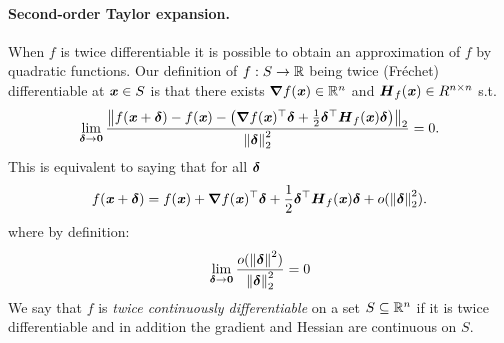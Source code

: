 


\paragraph{Second-order Taylor expansion.}  When $f$ is twice differentiable it is possible to obtain an approximation of $f$ by quadratic functions.
Our definition of $f:S\rightarrow \R$ being twice (Fr\'{e}chet) differentiable at
$\xx \in S$ is that there exists $\grad f(\xx) \in \R^n$ and
$\HH_f(\xx) \in R^{n \times n}$ s.t.
\begin{displaymath}
  \lim_{\ddelta \to \veczero}
  \frac{\norm{f(\xx+\ddelta) -f(\xx)
      -\left( \grad f(\xx)^{\trp} \ddelta + \frac{1}{2}\ddelta^\trp
        \HH_f(\xx) \ddelta \right) }_2}{
    \norm{\ddelta}_2^2
  } = 0
    .
\end{displaymath}
This is equivalent to saying that for all $\ddelta$
\begin{displaymath}
  f(\xx+\ddelta) = f(\xx) + \grad f(\xx)^\trp \ddelta + \frac{1}{2}\ddelta^\trp  \HH_f(\xx) \ddelta + o(\norm{\ddelta}_2^2).
\end{displaymath}
where by definition:
\begin{displaymath}
  \lim_{\ddelta \rightarrow \veczero} \frac{o(\norm{\ddelta}^2)}{\norm{\ddelta}_2^2} = 0
\end{displaymath}
We say that $f$ is \emph{twice continuously differentiable} on a set $S \subseteq \R^n $ if it is
twice differentiable and in addition the gradient and Hessian are continuous on $S$.

